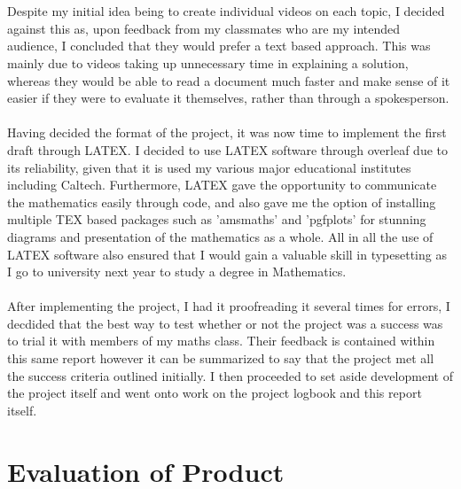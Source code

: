 \documentclass[12pt]{report}
\begin{document}
\\
\\
Despite my initial idea being to create individual videos on each topic, I decided against this as, upon feedback from my classmates who are my intended audience, I concluded that they would prefer a text based approach. This was mainly due to videos taking up unnecessary time in explaining a solution, whereas they would be able to read a document much faster and make sense of it easier if they were to evaluate it themselves, rather than through a spokesperson.
\\
\\
Having decided the format of the project, it was now time to implement the first draft through LATEX. I decided to use LATEX software through overleaf due to its reliability, given that it is used my various major educational institutes including Caltech. Furthermore, LATEX gave the opportunity to communicate the mathematics easily through code, and also gave me the option of installing multiple TEX based packages such as 'amsmaths' and 'pgfplots' for stunning diagrams and presentation of the mathematics as a whole. All in all the use of LATEX software also ensured that I would gain a valuable skill in typesetting as I go to university next year to study a degree in Mathematics.
\\
\\
After implementing the project, I had it proofreading it several times for errors, I decdided that the best way to test whether or not the project was a success was to trial it with members of my maths class. Their feedback is contained within this same report however it can be summarized to say that the project met all the success criteria outlined initially. I then proceeded to set aside development of the project itself and went onto work on the project logbook and this report itself.


\chapter{Evaluation of Product}
\end{document}

